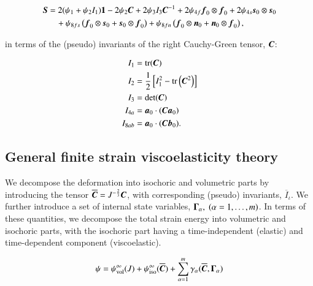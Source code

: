 \begin{equation}
  \begin{split}
    \mbox{\boldmath$ S$} &=   2 (\psi_{1} + \psi_{2} I_{1}) {\bf 1}
           - 2 \psi_{2} \mbox{\boldmath$ C$}
                + 2 \psi_{3} I_{3} \mbox{\boldmath$ C$}^{-1}
                + 2 \psi_{4f} \mbox{\boldmath$ f$}_{0}\otimes\mbox{\boldmath$ f$}_{0}
                + 2 \psi_{4s} \mbox{\boldmath$ s$}_{0}\otimes\mbox{\boldmath$ s$}_{0}\\
        &\quad  + \psi_{8fs} \left( \mbox{\boldmath$ f$}_{0}\otimes\mbox{\boldmath$ s$}_{0} + \mbox{\boldmath$ s$}_{0}\otimes\mbox{\boldmath$ f$}_{0} \right)
                + \psi_{8fn} \left( \mbox{\boldmath$ f$}_{0}\otimes\mbox{\boldmath$ n$}_{0} + \mbox{\boldmath$ n$}_{0}\otimes\mbox{\boldmath$ f$}_{0} \right),
  \end{split}
  \label{second-piola-kirchhoff-stress}
\end{equation}

\noindent in terms of the (pseudo) invariants of the right
Cauchy-Green tensor, $\mbox{\boldmath$ C$}$:

\begin{equation}
  \begin{split}
    I_{1} &= \mathrm{tr}(\mbox{\boldmath$ C$})\\
    I_{2} &= \frac{1}{2}\left[I_{1}^{2} - \mathrm{tr}\left(\mbox{\boldmath$ C$}^{2}\right)\right]\\
    I_{3} &= \mathrm{det}(\mbox{\boldmath$ C$})\\
    I_{4a} &= \mbox{\boldmath$ a$}_{0}\cdot(\mbox{\boldmath$ C$}\mbox{\boldmath$ a$}_{0})\\
    I_{8ab} &= \mbox{\boldmath$ a$}_{0}\cdot(\mbox{\boldmath$ C$}\mbox{\boldmath$ b$}_{0}).
  \end{split}
\end{equation}

\subsection{General finite strain viscoelasticity theory}
\label{general-viscoelasticity-theory}

We decompose the deformation into isochoric and volumetric parts by
introducing the  tensor $\overline{\mbox{\boldmath$ C$}} = J^{-\frac{2}{3}} \mbox{\boldmath$ C$}$, with
corresponding (pseudo) invariants, $\overline{I}_{\iota}$. We further
introduce a set of internal state variables, $\mbox{\boldmath$\Gamma$}_{\alpha},\;
(\alpha = 1, \ldots, m)$. In terms of these quantities, we decompose
the total strain energy into volumetric and isochoric parts, with the
isochoric part having a time-independent (elastic) and time-dependent
component (viscoelastic).

\begin{equation}
  \psi = \psi_{\mathrm{vol}}^{\infty}(J) + \psi_{\mathrm{iso}}^{\infty}(\overline{\mbox{\boldmath$ C$}})
       + \sum_{\alpha = 1}^{m} \gamma_{\alpha}(\overline{\mbox{\boldmath$ C$}}, \mbox{\boldmath$\Gamma$}_{\alpha})
\end{equation}


